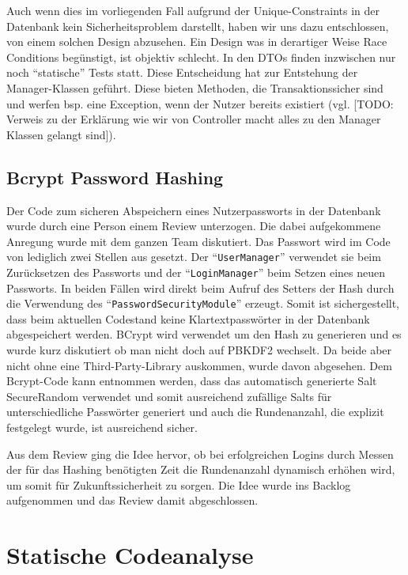 \documentclass[12pt,DIV14,BCOR10mm,a4paper,parskip=half-,headsepline,headinclude,english,ngerman,bibliography=totocnumbered]{scrreprt}
\begin{document}
Auch wenn dies im vorliegenden Fall aufgrund der Unique-Constraints in der Datenbank kein Sicherheitsproblem darstellt, haben wir uns dazu entschlossen, von einem solchen Design abzusehen. Ein Design was in derartiger Weise Race Conditions begünstigt, ist objektiv schlecht. In den DTOs finden inzwischen nur noch \enquote{statische} Tests statt. Diese Entscheidung hat zur Entstehung der Manager-Klassen geführt. Diese bieten Methoden, die Transaktionssicher sind und werfen bsp. eine Exception, wenn der Nutzer bereits existiert (vgl. [TODO: Verweis zu der Erklärung wie wir von Controller macht alles zu den Manager Klassen gelangt sind]).

\subsection{Bcrypt Password Hashing}
Der Code zum sicheren Abspeichern eines Nutzerpassworts in der Datenbank wurde durch eine Person einem Review unterzogen. Die dabei aufgekommene Anregung wurde mit dem ganzen Team diskutiert. Das Passwort wird im Code von lediglich zwei Stellen aus gesetzt. Der \enquote{\texttt{UserManager}} verwendet sie beim Zurücksetzen des Passworts und der \enquote{\texttt{LoginManager}} beim Setzen eines neuen Passworts. In beiden Fällen wird direkt beim Aufruf des Setters der Hash durch die Verwendung des \enquote{\texttt{PasswordSecurityModule}} erzeugt. Somit ist sichergestellt, dass beim aktuellen Codestand keine Klartextpasswörter in der Datenbank abgespeichert werden. BCrypt wird verwendet um den Hash zu generieren und es wurde kurz diskutiert ob man nicht doch auf PBKDF2 wechselt. Da beide aber nicht ohne eine Third-Party-Library auskommen, wurde davon abgesehen. Dem Bcrypt-Code \autocite{BcryptCode} kann entnommen werden, dass das automatisch generierte Salt SecureRandom verwendet und somit ausreichend zufällige Salts für unterschiedliche Passwörter generiert und auch die Rundenanzahl, die explizit festgelegt wurde, ist ausreichend sicher.

Aus dem Review ging die Idee hervor, ob bei erfolgreichen Logins durch Messen der für das Hashing benötigten Zeit die Rundenanzahl dynamisch erhöhen wird, um somit für Zukunftssicherheit zu sorgen. Die Idee wurde ins Backlog aufgenommen und das Review damit abgeschlossen.

\section{Statische Codeanalyse}
\end{document}
